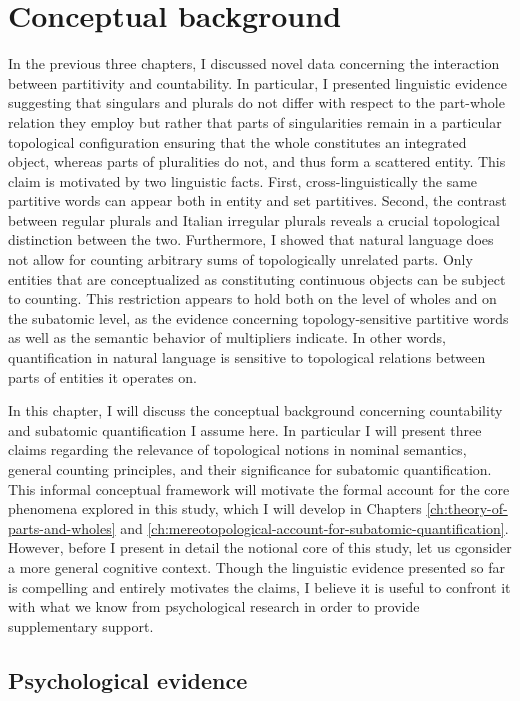\chapter{Conceptual background}\label{ch:conceptual-background}

In the previous three chapters, I discussed novel data concerning the interaction between partitivity and countability. In particular, I presented linguistic evidence suggesting that singulars and plurals do not differ with respect to the part-whole relation they employ but rather that parts of singularities remain in a particular topological configuration ensuring that the whole constitutes an integrated object, whereas parts of pluralities do not, and thus form a scattered entity. This claim is motivated by two linguistic facts. First, cross-linguistically the same partitive words can appear both in entity and set partitives. Second, the contrast between regular plurals  and Italian irregular plurals reveals a crucial topological distinction between the two. Furthermore, I showed that natural language does not allow for counting arbitrary sums of topologically unrelated parts. Only entities that are conceptualized as constituting continuous objects can be subject to counting. This restriction appears to hold both on the level of wholes and on the subatomic level, as the evidence concerning topology-sensitive partitive words as well as the semantic behavior of multipliers indicate. In other words, quantification in natural language is sensitive to topological relations between parts of entities it operates on.  

In this chapter, I will discuss the conceptual background concerning countability and subatomic quantification I assume here. In particular I will present three claims regarding the relevance of topological notions in nominal semantics, general counting principles, and their significance for subatomic quantification. This informal conceptual framework will motivate the formal account for the core phenomena explored in this study, which I will develop in Chapters \ref{ch:theory-of-parts-and-wholes} and \ref{ch:mereotopological-account-for-subatomic-quantification}. However, before I present in detail the notional core of this study, let us cgonsider a more general cognitive context. Though the linguistic evidence presented so far is compelling and entirely motivates the claims, I believe it is useful to confront it with what we know from psychological research in order to provide supplementary support. 

\section{Psychological evidence}\label{sec:psychological-evidence}

